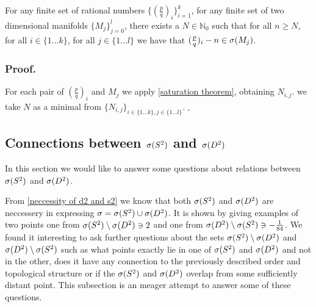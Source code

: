 \begin{corollary}\label{Saturation theorem corollary}
For any finite set of rational numbers $\{(\frac{p}{q})_i\}_{i=1}^k$, for any 
finite set of two dimensional manifolds $\{M_j\}_{j=0}^l$, there exists 
a $N\in\mathbb{N}_0$ such that 
for all $n \geq N$, for all $i\in \{1 \dots k\}$, 
for all $j\in\{1\dots l\}$ we have that  $(\frac{p}{q})_i - n \in {{\sigma}(M_j)}$.
\end{corollary}
\subsubsection{Proof.}
For each pair of $(\frac{p}{q})_i$ and $M_j$ we apply \ref{saturation theorem}, 
obtaining $N_{i,j}$. 
we take $N$ as a minimal from $\{N_{i,j}\}_{i\in\{1\dots k\}, j\in \{1\dots l\}}$. $_\square$ 

\subsection{Connections between ${{\sigma}(S^2)}$ and ${{\sigma}(D^2)}$}\label{D_and_S}
In this section we would like to 
answer some questions about 
relations between ${{\sigma}(S^2)}$ and ${{\sigma}(D^2)}$. 

From \ref{neccessity of d2 and s2} we know that both ${{\sigma}(S^2)}$ and ${{\sigma}(D^2)}$ are neccessery 
in expressing ${\sigma} = {{\sigma}(S^2)} \cup {{\sigma}(D^2)}$. It is shown by giving examples of two points 
one from ${{\sigma}(S^2)} \setminus {{\sigma}(D^2)} \ni 2$ and one from ${{\sigma}(D^2)} \setminus {{\sigma}(S^2)} \ni -\frac{1}{84}$.
We found it interesting to ask further questions about the sets  
${{\sigma}(S^2)} \setminus {{\sigma}(D^2)}$ and ${{\sigma}(D^2)} \setminus {{\sigma}(S^2)}$ such as what points 
exactly lie in one of ${{\sigma}(S^2)}$ and ${{\sigma}(D^2)}$ and not in the other, does it have 
any connection to the previously described order and topological structure 
or if the ${{\sigma}(S^2)}$ and ${{\sigma}(D^2)}$ 
overlap from some sufficiently distant point. This subsection is an meager attempt to 
answer some of these questions.
